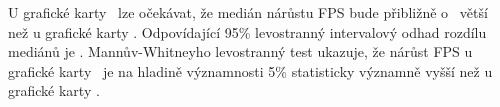 \begin{enumerate}[label=\alph*)]
\begin{minipage}{0.94\textwidth}
        \label{tab:median-comparison}
        \vspace{0.5em}
        \renewcommand{\arraystretch}{1.3}
        \vspace{1em}

        U grafické karty \nvidiaCardTri\ lze očekávat, že medián nárůstu FPS bude přibližně o \pointGuess\ větší než u grafické karty \amdCardSedm.\@
        Odpovídající 95\% levostranný intervalový odhad rozdílu mediánů je \wilcoxLeftSidedInterval.\@
        Mannův-Whitneyho levostranný test ukazuje, že nárůst FPS u grafické karty \nvidiaCardTri\ je na hladině významnosti 5\% statisticky významně
        vyšší než u grafické karty \amdCardSedm.\@
    \end{minipage}
\end{enumerate}

\endinput